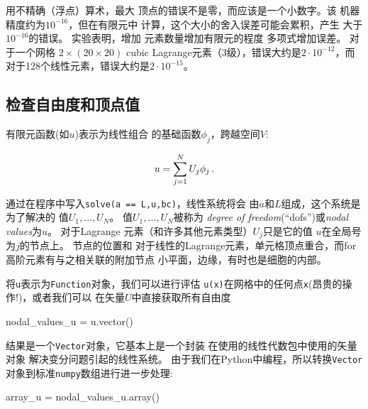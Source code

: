 \begin{notice}[如何检查错误消失]
用不精确（浮点）算术，最大
顶点的错误不是零，而应该是一个小数字。该
机器精度约为$10^{-16}$，但在有限元中
计算，这个大小的舍入误差可能会累积，产生
大于$10^{-16}$的错误。 实验表明，增加
元素数量增加有限元的程度
多项式增加误差。 对于一个网格
$2\times(20\times20)$ cubic Lagrange元素（3级），错误大约是$2\cdot
10^{-12}$，而对于128个线性元素，错误大约是$2\cdot
10^{-15}$。
\end{notice}

\subsection{检查自由度和顶点值}
\label{ch:poisson0:impl:dofmap}


有限元函数(如$u$)表示为线性组合
的基础函数$\phi_j$，跨越空间$V$:

\begin{equation}
u = \sum_{j=1}^N U_j \phi_j \label{ch:poisson0:ufem}\tp
\end{equation}

通过在程序中写入\texttt{solve(a == L,u,bc)}，线性系统将会
由$a$和$L$组成，这个系统是为了解决的
值$U_1,\ldots,U_N$。 值$U_1,\ldots,U_N$被称为
\emph{degree of freedom}(``dofs'')或\emph{nodal values}为$u$。 对于Lagrange
元素（和许多其他元素类型）$U_j$只是它的值
$u$在全局号为$j$的节点上。 节点的位置和
对于线性的Lagrange元素，单元格顶点重合，而for
高阶元素有与之相关联的附加节点
小平面，边缘，有时也是细胞的内部。

将\texttt{u}表示为\texttt{Function}对象，我们可以进行评估
\texttt{u(x)}在网格中的任何点\texttt{x}(昂贵的操作!)，或者我们可以
在矢量$U$中直接获取所有自由度

\begin{python}
nodal_values_u = u.vector()
\end{python}
结果是一个\texttt{Vector}对象，它基本上是一个封装
在使用的线性代数包中使用的矢量对象
解决变分问题引起的线性系统。
由于我们在Python中编程，所以转换\texttt{Vector}
对象到标准\texttt{numpy}数组进行进一步处理:


\begin{python}
array_u = nodal_values_u.array()
\end{python}

